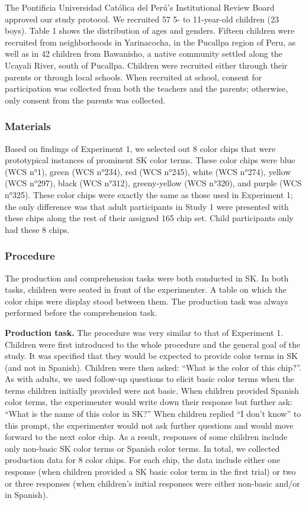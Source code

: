 \documentclass[floatsintext,man]{apa6}
\theoremstyle{definition}
\theoremstyle{definition}
\theoremstyle{definition}
\theoremstyle{remark}
\begin{document}
The Pontificia Universidad Católica del Perú's Institutional Review
Board approved our study protocol. We recruited 57 5- to 11-year-old
children (23 boys). Table 1 shows the distribution of ages and genders.
Fifteen children were recruited from neighborhoods in Yarinacocha, in
the Pucallpa region of Peru, as well as in 42 children from Bawanisho, a
native community settled along the Ucayali River, south of Pucallpa.
Children were recruited either through their parents or through local
schools. When recruited at school, consent for participation was
collected from both the teachers and the parents; otherwise, only
consent from the parents was collected.

\subsubsection{Materials}\label{materials-1}

Based on findings of Experiment 1, we selected out 8 color chips that
were prototypical instances of prominent SK color terms. These color
chips were blue (WCS n°1), green (WCS n°234), red (WCS n°245), white
(WCS n°274), yellow (WCS n°297), black (WCS n°312), greeny-yellow (WCS
n°320), and purple (WCS n°325). These color chips were exactly the same
as those used in Experiment 1; the only difference was that adult
participants in Study 1 were presented with these chips along the rest
of their assigned 165 chip set. Child participants only had these 8
chips.

\subsubsection{Procedure}\label{procedure-1}

The production and comprehension tasks were both conducted in SK. In
both tasks, children were seated in front of the experimenter. A table
on which the color chips were display stood between them. The production
task was always performed before the comprehension task.

\textbf{Production task.} The procedure was very similar to that of
Experiment 1. Children were first introduced to the whole procedure and
the general goal of the study. It was specified that they would be
expected to provide color terms in SK (and not in Spanish). Children
were then asked: \enquote{What is the color of this chip?}. As with
adults, we used follow-up questions to elicit basic color terms when the
terms children initially provided were not basic. When children provided
Spanish color terms, the experimenter would write down their response
but further ask: \enquote{What is the name of this color in SK?} When
children replied \enquote{I don't know} to this prompt, the experimenter
would not ask further questions and would move forward to the next color
chip. As a result, responses of some children include only non-basic SK
color terms or Spanish color terms. In total, we collected production
data for 8 color chips. For each chip, the data include either one
response (when children provided a SK basic color term in the first
trial) or two or three responses (when children's initial responses were
either non-basic and/or in Spanish).
\end{document}
